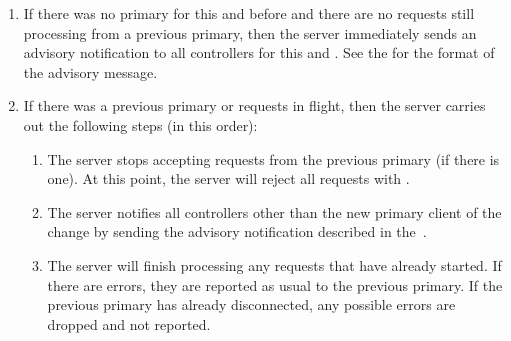 \documentclass[11pt]{article}
\begin{document}
{\begin{enumerate}
\begin{enumerate}%

\item{}
If there was no primary for this  and  before and
there are no  requests still processing from a previous primary,
then the server immediately sends an advisory notification to all
controllers for this  and . See the
 for the format of the
advisory message.%

\item{}
If there was a previous primary or  requests in flight, then the
server carries out the following steps (in this order):%

\begin{enumerate}%

\item{}
The server stops accepting  requests from the previous primary
(if there is one). At this point, the server will reject all 
requests with .%

\item{}
The server notifies all controllers other than the new primary client
of the change by sending the advisory notification described in
the~.%

\item{}
The server will finish processing any  requests that have
already started. If there are errors, they are reported as usual to
the previous primary. If the previous primary has already
disconnected, any possible errors are dropped and not reported.%


\end{enumerate}
\end{enumerate}
\end{enumerate}}
\end{document}
